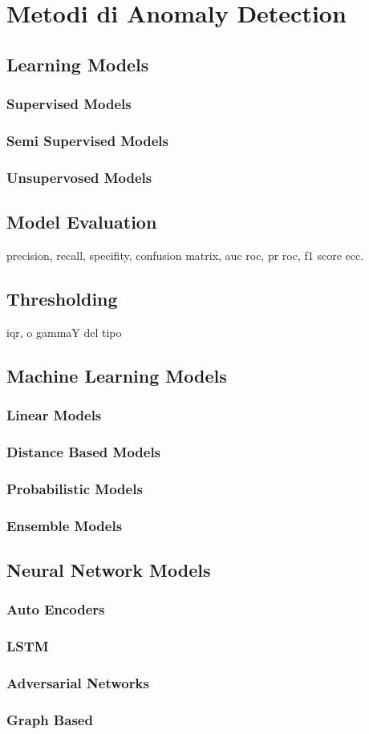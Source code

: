 \chapter{Metodi di Anomaly Detection}

\section{Learning Models}
\subsection{Supervised Models}
\subsection{Semi Supervised Models}
\subsection{Unsupervosed Models}

\section{Model Evaluation}
precision, recall, specifity, confusion matrix, auc roc, pr roc, f1 score ecc.

\section{Thresholding}
iqr, o gammaY del tipo

\section{Machine Learning Models}
\subsection{Linear Models}
\subsection{Distance Based Models}
\subsection{Probabilistic Models}
\subsection{Ensemble Models}

\section{Neural Network Models}
\subsection{Auto Encoders}
\subsection{LSTM}
\subsection{Adversarial Networks}
\subsection{Graph Based}